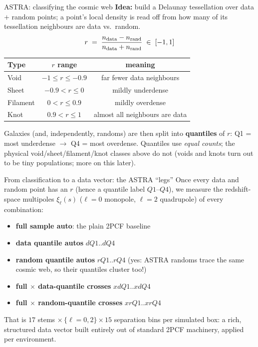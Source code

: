 \documentclass[aspectratio=169,11pt]{beamer}
\begin{document}
\begin{frame}{ASTRA: classifying the cosmic web}
\textbf{Idea:} build a Delaunay tessellation over data $+$ random points; a point's
local density is read off from how many of its tessellation neighbours are data vs.\
random.
\[
r \;=\; \frac{n_{\rm data} - n_{\rm rand}}{n_{\rm data} + n_{\rm rand}} \;\in\; [-1,1]
\]
\vspace{2pt}
\begin{center}
\begin{tabular}{lcc}
\toprule
Type & $r$ range & meaning \\
\midrule
Void      & $-1 \le r \le -0.9$   & far fewer data neighbours \\
Sheet     & $-0.9 < r \le 0$      & mildly underdense \\
Filament  & $0 < r \le 0.9$       & mildly overdense \\
Knot      & $0.9 < r \le 1$       & almost all neighbours are data \\
\bottomrule
\end{tabular}
\end{center}
\vspace{6pt}
Galaxies (and, independently, randoms) are then split into \textbf{quantiles} of
$r$: Q1 = most underdense $\to$ Q4 = most overdense. Quantiles use \emph{equal
counts}; the physical void/sheet/filament/knot classes above do not (voids and
knots turn out to be tiny populations; more on this later).
\end{frame}

\begin{frame}{From classification to a data vector: the ASTRA ``legs''}
Once every data and random point has an $r$ (hence a quantile label $Q1$--$Q4$),
we measure the redshift-space multipoles $\xi_\ell(s)$ ($\ell=0$ monopole,
$\ell=2$ quadrupole) of every combination:
\begin{itemize}
\item \textbf{full sample auto}: the plain 2PCF baseline
\item \textbf{data quantile autos} $dQ1..dQ4$
\item \textbf{random quantile autos} $rQ1..rQ4$ (yes: ASTRA randoms trace the
  same cosmic web, so their quantiles cluster too!)
\item \textbf{full $\times$ data-quantile crosses} $xdQ1..xdQ4$
\item \textbf{full $\times$ random-quantile crosses} $xrQ1..xrQ4$
\end{itemize}
That is $17$ stems $\times\,\{\ell=0,2\}\times 15$ separation bins per simulated
box: a rich, structured data vector built entirely out of standard 2PCF
machinery, applied per environment.
\end{frame}
\end{document}
